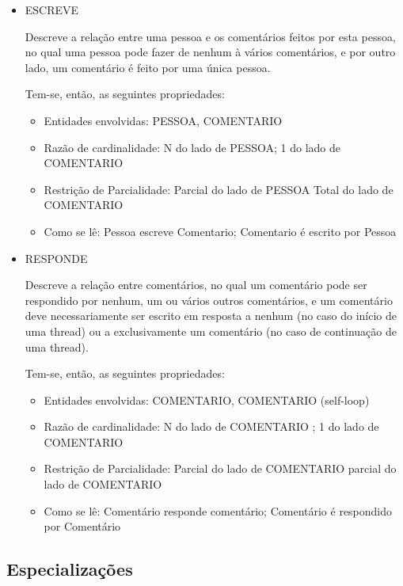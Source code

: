 \documentclass{article}
\begin{document}
\begin{itemize}
				\item ESCREVE

Descreve a relação entre uma pessoa e os comentários feitos por esta pessoa, no qual uma pessoa pode fazer de nenhum à vários comentários, e por outro lado, um comentário é feito por uma única pessoa.

Tem-se, então, as seguintes propriedades:
\begin{itemize}

\item Entidades envolvidas: PESSOA, COMENTARIO
\item Razão de cardinalidade: N do lado de PESSOA; 1 do lado de COMENTARIO
\item Restrição de Parcialidade: Parcial do lado de PESSOA                        Total do lado de COMENTARIO
\item Como se lê: Pessoa escreve Comentario; Comentario é escrito por Pessoa
\end{itemize}
\end{itemize}

\begin{itemize}
				\item RESPONDE

Descreve a relação entre comentários, no qual um comentário pode ser respondido por nenhum, um ou vários outros comentários, e um comentário deve necessariamente ser escrito em resposta a nenhum (no caso do início de uma thread) ou a exclusivamente um comentário (no caso de continuação de uma thread).

Tem-se, então, as seguintes propriedades:
\begin{itemize}

\item Entidades envolvidas: COMENTARIO, COMENTARIO (self-loop)
\item Razão de cardinalidade:     N do lado de COMENTARIO                        ; 1 do lado de COMENTARIO
\item Restrição de Parcialidade: Parcial do lado de COMENTARIO                        parcial do lado de COMENTARIO
\item Como se lê: Comentário responde comentário; Comentário é respondido por Comentário
\end{itemize}
\end{itemize}

\subsection{Especializações}
\end{document}
